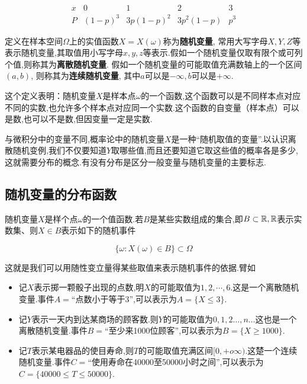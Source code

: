 \[
\begin{array}{c|cccc}{x} & {0} & {1} & {2} & {3} \\ \hline P & {(1-p)^{3}} & {3 p(1-p)^{2}} & {3 p^{2}(1-p)} & {p^{3}}\end{array}
\]

\begin{definition}{}{}
	定义在样本空间$\Omega$上的实值函数$ X=X(\omega) $称为\textbf{随机变量}, 常用大写字母$ X,Y,Z $等表示随机变量,其取值用小写字母$ x,y,z$等表示.假如一个随机变量仅取有限个或可列个值,则称其为\textbf{离散随机变量}. 假如一个随机变量的可能取值充满数轴上的一个区间$ (a,b) $, 则称其为\textbf{连续随机变量}, 其中$ a $可以是$ -\infty ,b $可以是$ +\infty $.
\end{definition}


这个定义表明：随机变量$ X $是样本点$ \omega $的一个函数,这个函数可以是不同样本点对应不同的实数,也允许多个样本点对应同一个实数.这个函数的自变量（样本点）可以是数,也可以不是数,但因变量一定是实数.

与微积分中的变量不同,概率论中的随机变量$ X $是一种“随机取值的变量”.以认识离散随机变例,我们不仅要知道$ Y $取哪些值,而且还要知道它取这些值的概率各是多少,这就需要分布的概念.有没有分布是区分一般变量与随机变量的主要标志.

\subsection{随机变量的分布函数}

随机变量$ X $是样个点$ \omega $的一个值函数.若$ B $是某些实数组成的集合,即$ B\subset \mathbb R , \mathbb R $表示实数集、则$ X\in B $表示如下的随机事件

\[
\{\omega: X(\omega)\in B\} \subset \Omega
\]

这就是我们可以用随性变立量得某些取值来表示随机事件的依据.臂如

\begin{itemize}
	\item 记$ X $表示掷一颗骰子出现的点数,明$ X $的可能取值为$ 1,2,\cdots ,6 $.这是一个离散随机变量.事件$A=$“点数小于等于3”,可以表示为$ A=\{X\leq 3\} $.
	\item 记$ Y $表示一天内到达某商场的顾客数.则$ Y $的可能取值为$ 0,1,2\dotsc ,n\dotsc $这也是一个离散随机变量.事件$B=$“至少来1000位顾客”,可以表示为$ B=\{ X\geq 1000 \} $.
	\item 记$ T $表示某电器品的使目寿命,则$T$的可能取值充满区间$ [0,+o\infty ) $.这楚一个连续随机变量.事件$C=$“使用寿命在40000至50000小时之间”,可以表示为$ C=\{ 40000 \le T\le 50000 \} $.
\end{itemize}



